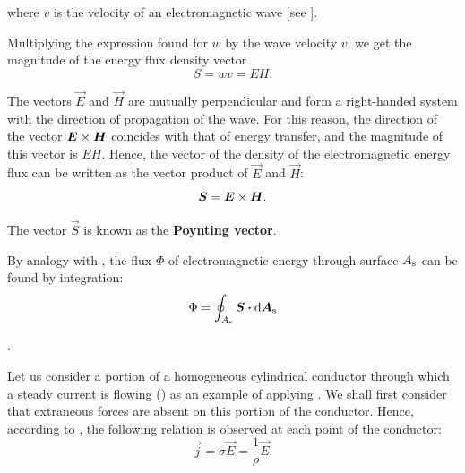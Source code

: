 \noindent
where $v$ is the velocity of an electromagnetic wave [see ].

Multiplying the expression found for $w$ by the wave velocity $v$, we get the magnitude of the energy flux density vector
\begin{equation}\label{eq:15_28}
    S = w v = EH.
\end{equation}

\noindent
The vectors $\vec{E}$ and $\vec{H}$ are mutually perpendicular and form a right-handed system with the direction of propagation of the wave.
For this reason, the direction of the vector $\boldsymbol{E}\times\boldsymbol{H}$ coincides with that of energy transfer, and the magnitude of this vector is $EH$.
Hence, the vector of the density of the electromagnetic energy flux can be written as the vector product of $\vec{E}$ and $\vec{H}$:
\begin{equation}\label{eq:15_29}
    \boldsymbol{S} = \boldsymbol{E}\times\boldsymbol{H}.
\end{equation}

\noindent
The vector $\vec{S}$ is known as the \textbf{Poynting vector}.

By analogy with , the flux $\Phi$ of electromagnetic energy through surface $A_{\text{s}}$ can be found by integration:
\begin{equation}\label{eq:15_30}
    \Phi = \oint_{A_{\text{s}}} \boldsymbol{S} \boldsymbol{\cdot} \mathrm{d}\boldsymbol{A}_{\text{s}}
\end{equation}

.

Let us consider a portion of a homogeneous cylindrical conductor through which a steady current is flowing () as an example of applying .
We shall first consider that extraneous forces are absent on this portion of the conductor.
Hence, according to , the following relation is observed at each point of the conductor:
\begin{equation*}
    \vec{j} = \sigma \vec{E} = \frac{1}{\rho} \vec{E}.
\end{equation*}

